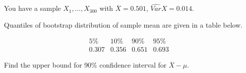 
\begin{question}
You have a sample \(X_1, \dots, X_{300}\) with \(\overline{X}= 0.501\), \(\widehat{Var}{X} = 0.014\).

Quantiles of bootstrap distribution of sample mean are given in a table below.

\[
\begin{array}{c|c|c|c}
5 \% & 10 \% & 90 \% & 95 \% \\
\hline
0.307 & 0.356 & 0.651 & 0.693
\end{array}
\]

Find the upper bound for 90\% confidence interval for \(\overline{X}-\mu\).
\end{question}


